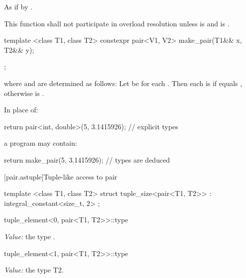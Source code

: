 \begin{itemdescr}
\pnum
\effects As if by .

\pnum
\remarks
This function shall not participate in overload resolution unless
 is  and
 is .
\end{itemdescr}

%
\begin{itemdecl}
template <class T1, class T2>
  constexpr pair<V1, V2> make_pair(T1&& x, T2&& y);
\end{itemdecl}

\begin{itemdescr}
\pnum
\returns {};

where  and  are determined as follows: Let  be
 for each . Then each  is 
if  equals , otherwise  is
.

\pnum
\enterexample
In place of:

\begin{codeblock}
  return pair<int, double>(5, 3.1415926);   // explicit types
\end{codeblock}

a \Cpp program may contain:

\begin{codeblock}
  return make_pair(5, 3.1415926);           // types are deduced
\end{codeblock}
\exitexample
\end{itemdescr}

[pair.astuple]{Tuple-like access to pair}

%
\begin{itemdecl}
template <class T1, class T2>
struct tuple_size<pair<T1, T2>>
  : integral_constant<size_t, 2> { };
\end{itemdecl}

%
\begin{itemdecl}
tuple_element<0, pair<T1, T2>>::type
\end{itemdecl}
\begin{itemdescr}
\pnum\textit{Value:} the type .
\end{itemdescr}

%
\begin{itemdecl}
tuple_element<1, pair<T1, T2>>::type
\end{itemdecl}
\begin{itemdescr}
\pnum\textit{Value:} the type T2.
\end{itemdescr}

